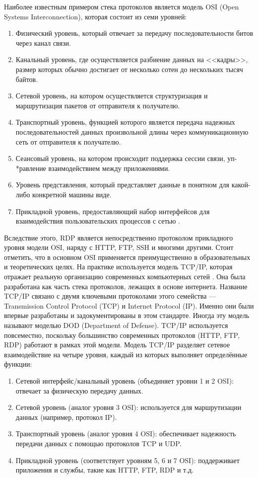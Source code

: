 \documentclass[bachelor, och, coursework]{SCWorks}
\begin{document}
Наиболее известным примером стека протоколов является модель OSI (Open Systems Interconnection), которая состоит из семи уровней:

\begin{enumerate}
  \item Физический уровень, который отвечает за передачу последовательности битов через канал связи.
  \item Канальный уровень, где осуществляется разбиение данных на <<кадры>>, размер которых обычно достигает
  от несколько сотен до нескольких тысяч байтов.
  \item Сетевой уровень, на котором осуществляется структуризация и маршрутизация пакетов от отправителя к получателю.
  \item Транспортный уровень, функцией которого является передача надежных последовательностей данных произвольной
  длины через коммуникационную сеть от отправителя к получателю.
  \item Сеансовый уровень, на котором происходит поддержка сессии связи, уп-\\*равление взаимодействием между приложениями.  
  \item Уровень представления, который представляет данные в понятном для какой-либо конкретной машины виде.
  \item Прикладной уровень, предоставляющий набор интерфейсов для взаимодействия пользовательских процессов с сетью \cite{osi-model}.
\end{enumerate}

Вследствие этого, RDP является непосредственно протоколом прикладного уровня модели OSI, наряду с HTTP, FTP, SSH и многими другими. Стоит отметить, что 
в основном OSI применяется преимущественно в образовательных и теоретических целях. На практике используется модель TCP/IP, которая отражает
реальную организацию современных компьютерных сетей \cite{stack}. Она была разработана как часть стека протоколов, лежащих в основе интернета. 
Название TCP/IP связано с двумя ключевыми протоколами этого семейства — Transmission Control Protocol (TCP) и Internet Protocol (IP). Именно они 
были впервые разработаны и задокументированы в этом стандарте. Иногда эту модель называют моделью DOD (Department of Defense).
TCP/IP используется повсеместно, поскольку большинство современных протоколов (HTTP, FTP, RDP) работают в рамках этой модели. Модель TCP/IP 
разделяет сетевое взаимодействие на четыре уровня, каждый из которых выполняет определённые функции:

\begin{enumerate}
    \item Сетевой интерфейс/канальный уровень (объединяет уровни 1 и 2 OSI): отвечает за физическую передачу данных.
    \item Сетевой уровень (аналог уровня 3 OSI): используется для маршрутизации данных (например, протокол IP).
    \item Транспортный уровень (аналог уровня 4 OSI): обеспечивает надежность передачи данных с помощью протоколов TCP и UDP.
    \item Прикладной уровень (соответствует уровням 5, 6 и 7 OSI): поддерживает приложения и службы, такие как HTTP, FTP, RDP и т.д.
\end{enumerate}
\end{document}
